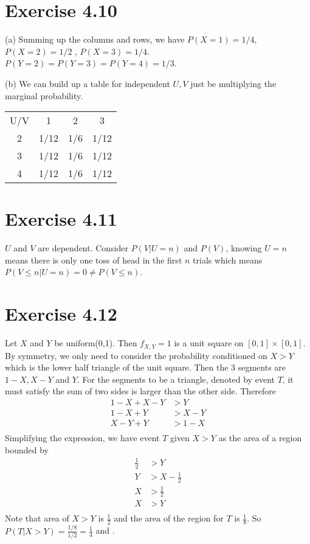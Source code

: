 \documentclass[12pt]{article}
\begin{document}
\section*{Exercise 4.10}
(a) Summing up the columns and rows, we have $P(X=1) = 1/4$, $P(X=2)=1/2$ , $P(X=3)=1/4$. 
$P(Y=2)= P(Y=3) = P(Y=4) = 1/3$. 

(b) We can build up a table for independent $U,V$ just be multiplying the marginal probability.
\begin{center}
\begin{tabular}{ |c|ccc| } 
\hline
U/V & 1& 2&  3 \\
2 & 1/12 & 1/6 & 1/12 \\ 
3 & 1/12 & 1/6 & 1/12 \\ 
4 & 1/12 & 1/6 & 1/12 \\ 
\hline
\end{tabular}
\end{center}

\section*{Exercise 4.11}
$U$ and $V$ are dependent. Consider $P(V|U=n)$ and $P(V)$, knowing $U=n$ means there is only one toss of head in the first $n$ trials which means $P(V \leq n | U = n) = 0 \neq P(V \leq n)$.

\section*{Exercise 4.12}
Let $X$ and $Y$ be uniform(0,1). Then $f_{X,Y} = 1$ is a unit square on $[0,1]\times[0,1]$. By symmetry, we only need to consider the probability conditioned on $X > Y$ which is the lower half triangle of the unit square. Then the 3 segments are $1 - X, X - Y$ and $Y$. For the segments to be a triangle, denoted by event $T$, it must satisfy the sum of two sides is larger than the other side. Therefore
$$\begin{aligned}
 1 - X + X - Y &> Y \\
 1 - X + Y &> X - Y  \\
 X - Y + Y &> 1 - X \\
\end{aligned}$$
Simplifying the expression, we have event $T$ given $X > Y$ as the area of a region bounded by 
$$\begin{aligned}
 \frac{1}{2} &> Y \\
 Y &> X - \frac{1}{2}  \\
 X &> \frac{1}{2} \\
 X &> Y \\
\end{aligned}$$
Note that area of $X > Y$ is $\frac{1}{2}$ and the area of the region for $T$ is $\frac{1}{8}$.  So $P(T | X > Y)  = \frac{1/8}{1/2} = \frac{1}{4}$ and .
\end{document}
